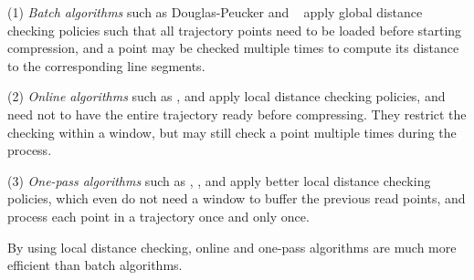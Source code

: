 \ni (1) {\em Batch algorithms} such as Douglas-Peucker\cite{Douglas:Peucker,Meratnia:Spatiotemporal} and \pavlidis~\cite{Pavlidis:Segment} apply global distance checking policies such that all trajectory points need to be loaded before starting compression, and a point may be checked multiple times to compute its distance to the corresponding line segments.

\ni (2) {\em Online algorithms} such as \opwa \cite{Meratnia:Spatiotemporal}, \squishe \cite{Muckell:SQUISH} and \bqsa \cite{Liu:BQS} apply local distance checking policies, and need not to have the entire trajectory ready before compressing. They restrict the checking within a window, but may still check a point  multiple times during the process.

\ni (3) {\em One-pass algorithms} such as \operb\cite{Lin:Operb}, \siped  \cite{Williams:Longest,Sklansky:Cone,Dunham:Cone, Zhao:Sleeve}, \cised \cite{Lin:Cised} and \ridad \cite{Ke:Interval} apply better local distance checking policies, which even do not need a window to buffer the previous read points, and process each point in a trajectory once and only once.

By using local distance checking, online and one-pass algorithms are much more efficient than batch algorithms.




